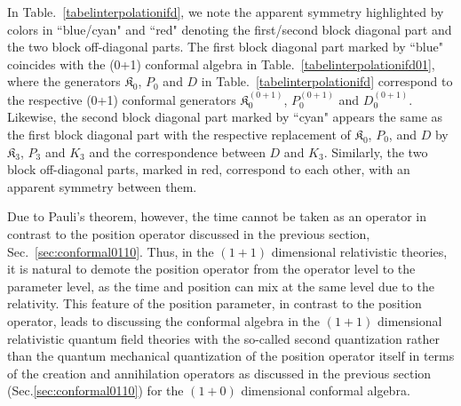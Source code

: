 \documentclass[%
 reprint,
superscriptaddress,
 amsmath,amssymb,
 aps,
]{revtex4-2}
\begin{document}
In Table.~\ref{tabelinterpolationifd}, we note the apparent symmetry highlighted by colors in ``blue/cyan" and ``red" denoting the first/second block diagonal part and the two block off-diagonal parts. The first block diagonal part marked by ``blue" coincides with the (0+1) conformal algebra in Table.~\ref{tabelinterpolationifd01}, where the generators $\mathfrak{K}_{{0}}$, $P_0$ and $D$ in Table.~\ref{tabelinterpolationifd} correspond to the respective (0+1) conformal generators $\mathfrak{K}^{(0+1)}_{{0}}$, $P^{(0+1)}_{0}$ and $D^{(0+1)}_{0}$. Likewise, the second block diagonal part marked by ``cyan" appears the same as the first block diagonal part with the respective replacement of $\mathfrak{K}_{{0}}$, $P_0$, and $D$ by 
$\mathfrak{K}_{{3}}$, $P_3$ and $K_3$ and the correspondence between $D$ and $K_3$. Similarly, the two block off-diagonal parts, marked in red, correspond to each other, with an apparent symmetry between them. 

Due to Pauli's theorem\cite{Galapon1999}, however, the time cannot be taken as an operator in contrast to the position operator discussed in the previous section, Sec.~\ref{sec:conformal0110}. Thus, in the $(1+1)$ dimensional relativistic theories, it is natural to demote the position operator from the operator level to the parameter level, as the time and position can mix at the same level due to the relativity. This feature of the position parameter, in contrast to the position operator, leads to   
discussing the conformal algebra in the $(1+1)$ dimensional relativistic quantum field theories 
with the so-called second quantization
rather than the quantum mechanical quantization of the position operator itself in terms of the creation and annihilation operators as discussed in the previous section (Sec.\ref{sec:conformal0110}) for the $(1+0)$ dimensional conformal algebra.  

\end{document}
